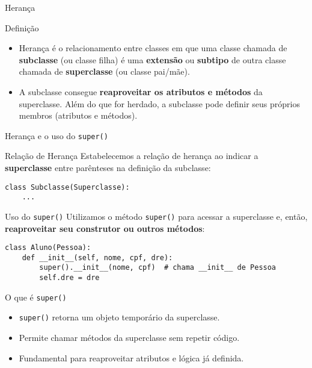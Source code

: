 \begin{frame}{Herança}

    \begin{block}{Definição}
        \begin{itemize}
            \item Herança é o relacionamento entre classes em que uma classe chamada de
                  \textbf{subclasse} (ou classe filha) é uma \textbf{extensão} ou \textbf{subtipo}
                  de outra classe chamada de \textbf{superclasse} (ou classe pai/mãe).

            \item A subclasse consegue \textbf{reaproveitar os atributos e métodos} da superclasse.
                  Além do que for herdado, a subclasse pode definir seus próprios membros
                  (atributos e métodos).
        \end{itemize}


    \end{block}

\end{frame}

\begin{frame}[fragile]{Herança e o uso do \texttt{super()}}

    \begin{block}{Relação de Herança}
        Estabelecemos a relação de herança ao indicar a \textbf{superclasse} entre parênteses na definição da subclasse:

        \begin{verbatim}
class Subclasse(Superclasse):
    ...
\end{verbatim}
    \end{block}

    \begin{block}{Uso do \texttt{super()}}
        Utilizamos o método \texttt{super()} para acessar a superclasse e, então, \textbf{reaproveitar seu construtor ou outros métodos}:

        \begin{verbatim}
class Aluno(Pessoa):
    def __init__(self, nome, cpf, dre):
        super().__init__(nome, cpf)  # chama __init__ de Pessoa
        self.dre = dre
\end{verbatim}
    \end{block}

\end{frame}

\begin{frame}[fragile]{O que é \texttt{super()}}
    \begin{itemize}
        \item \texttt{super()} retorna um objeto temporário da superclasse.
        \item Permite chamar métodos da superclasse sem repetir código.
        \item Fundamental para reaproveitar atributos e lógica já definida.
    \end{itemize}

\end{frame}



